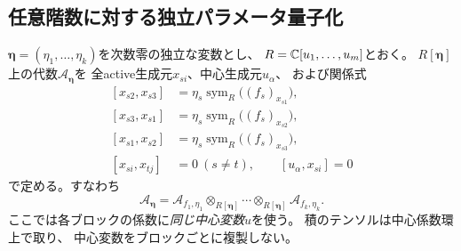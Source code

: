 \subsection{任意階数に対する独立パラメータ量子化}
$\boldsymbol\eta=(\eta_1,\ldots,\eta_k)$を次数零の独立な変数とし、
$R=\mathbb C[u_1,\ldots,u_m]$とおく。
$R[\boldsymbol\eta]$上の代数$\mathcal A_{\boldsymbol\eta}$を
全active生成元$x_{si}$、中心生成元$u_\alpha$、
および関係式
\begin{equation}
\begin{aligned}
 [x_{s2},x_{s3}]
 &=\eta_s\operatorname{sym}_R\bigl((f_s)_{x_{s1}}\bigr),\\
 [x_{s3},x_{s1}]
 &=\eta_s\operatorname{sym}_R\bigl((f_s)_{x_{s2}}\bigr),\\
 [x_{s1},x_{s2}]
 &=\eta_s\operatorname{sym}_R\bigl((f_s)_{x_{s3}}\bigr),\\
 [x_{si},x_{tj}]&=0\ (s\ne t),\qquad [u_\alpha,x_{si}]=0
\end{aligned}
\label{eq:pg-ad-relations}
\end{equation}
で定める。すなわち
\begin{equation}
 \mathcal A_{\boldsymbol\eta}
 =\mathcal A_{f_1,\eta_1}
 \otimes_{R[\boldsymbol\eta]}\cdots
 \otimes_{R[\boldsymbol\eta]}\mathcal A_{f_k,\eta_k}.
 \label{eq:pg-ad-tensor}
\end{equation}
ここでは各ブロックの係数に\emph{同じ中心変数$u$}を使う。
積のテンソルは中心係数環上で取り、
中心変数をブロックごとに複製しない。

